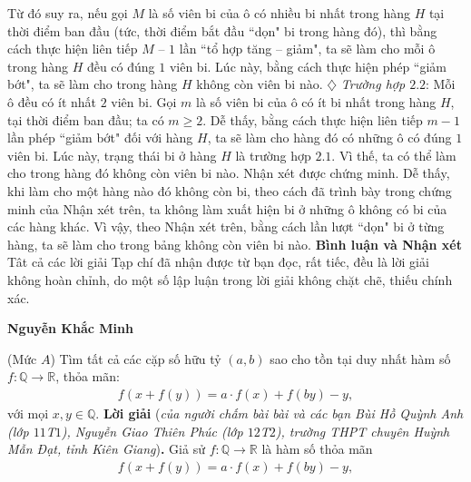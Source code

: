 \begin{multicols}{2}
	\vskip 0.05cm
	Từ đó suy ra, nếu gọi $M$ là số viên bi của ô có nhiều bi nhất trong hàng $H$ tại thời điểm ban đầu (tức, thời điểm bắt đầu ``dọn" bi trong hàng đó), thì bằng cách thực hiện liên tiếp $M$ -- $1$ lần ``tổ hợp tăng -- giảm", ta sẽ làm cho mỗi ô trong hàng $H$ đều có đúng $1$ viên bi. Lúc này, bằng cách thực hiện phép ``giảm bớt", ta sẽ làm cho trong hàng $H$ không còn viên bi nào.
	\vskip 0.05cm
	$\diamondsuit$ \textit{Trường hợp $2.2$}: Mỗi ô đều có ít nhất $2$ viên bi.
	\vskip 0.05cm
	Gọi $m$ là số viên bi của ô có ít bi nhất trong hàng $H$, tại thời điểm ban đầu; ta có $m \ge 2$.
	\vskip 0.05cm
	Dễ thấy, bằng cách thực hiện liên tiếp $m - 1$ lần phép ``giảm bớt" đối với hàng $H$, ta sẽ làm cho hàng đó có những ô có đúng $1$ viên bi. Lúc này, trạng thái bi ở hàng $H$ là trường hợp $2.1$. Vì thế, ta có thể làm cho trong hàng đó không còn viên bi nào.
	\vskip 0.05cm
	Nhận xét được chứng minh.
	\vskip 0.05cm
	Dễ thấy, khi làm cho một hàng nào đó không còn bi, theo cách đã trình bày trong chứng minh của Nhận xét trên, ta không làm xuất hiện bi ở những ô không có bi của các hàng khác. Vì vậy, theo Nhận xét trên, bằng cách lần lượt ``dọn" bi ở từng hàng, ta sẽ làm cho trong bảng không còn viên bi nào.
	\vskip 0.05cm
	\textbf{\color{thachthuctoanhoc}Bình luận và Nhận xét}
	\vskip 0.05cm
	Tât cả các lời giải Tạp chí đã nhận được từ bạn đọc, rất tiếc, đều là lời giải không hoàn chỉnh, do một số lập luận trong lời giải không chặt chẽ, thiếu chính xác.
	\begin{flushright}
		\textbf{\color{thachthuctoanhoc}Nguyễn Khắc Minh}
	\end{flushright}
	{}
	(Mức $A$) Tìm tất cả các cặp số hữu tỷ $(a, b)$ sao cho tồn tại duy nhất hàm số $f: \mathbb{Q} \to \mathbb{R}$, thỏa mãn:
	\begin{align*}
		f\left( {x + f\left( y \right)} \right) = a \cdot f\left( x \right) + f\left( {by} \right) - y,
	\end{align*}
	với mọi $x, y \in \mathbb{Q}$.
	\vskip 0.05cm
	\textbf{\color{thachthuctoanhoc}Lời giải} (\textit{của người chấm bài bài và các bạn Bùi Hồ Quỳnh Anh (lớp $11$T$1$), Nguyễn Giao Thiên Phúc (lớp $12$T$2$), trường THPT chuyên Huỳnh Mẫn Đạt, tỉnh Kiên Giang})\textbf{\color{thachthuctoanhoc}.}
	\vskip 0.05cm
	Giả sử $f: \mathbb{Q} \to \mathbb{R}$  là hàm số thỏa mãn
	\begin{align*}
		f\left( {x + f\left( y \right)} \right) = a \cdot f\left( x \right) + f\left( {by} \right) - y, \tag{$1$}
	\end{align*}

\end{multicols}
